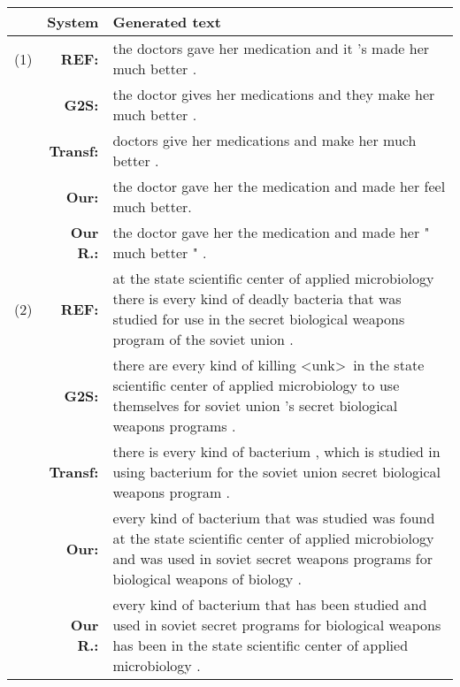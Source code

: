 \documentclass[11pt,a4paper]{article}
\begin{document}
\begin{table*}[ht!]
    \centering
    \fontsize{10pt}{12pt}\selectfont
    \setlength{\tabcolsep}{2.5pt}
    \begin{tabular}{c r p{13cm}}

         \bf  & \bf System    & \bf Generated text\\\hline \hline
         (1) & \bf REF:    & the doctors gave her medication and it 's made her much better .\\
             & \bf G2S:    & the doctor gives her medications and they make her much better .\\ 
             & \bf Transf: & doctors give her medications and make her much better .\\
             & \bf Our:     & the doctor gave her the medication and made her feel much better. \\
             & \bf Our R.:& the doctor gave her the medication and made her " much better " .\\ \hline

(2) & \bf REF: & at the state scientific center of applied microbiology there is every kind of deadly bacteria that was studied for use in the secret biological weapons program of the soviet union . \\
& \bf G2S: & there are every kind of killing \textless unk\textgreater~in the state scientific center of applied microbiology to use themselves for soviet union 's secret biological weapons programs .  \\
& \bf Transf:  & there is every kind of bacterium , which is studied in using bacterium for the soviet union secret biological weapons program . \\
& \bf Our: & every kind of bacterium that was studied was found at the state scientific center of applied microbiology and was used in soviet secret weapons programs for biological weapons of biology . \\
& \bf Our R.: & every kind of bacterium that has been studied and used in soviet secret programs for biological weapons has been in the state scientific center of applied microbiology . \\\hline


\end{tabular}
\end{table*}
\end{document}
